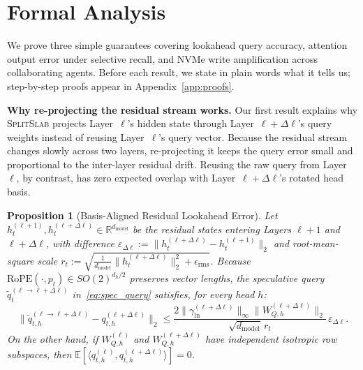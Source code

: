 \documentclass[pdflatex,sn-mathphys-num]{sn-jnl}
\theoremstyle{thmstyleone}
\newtheorem{proposition}{Proposition}
\newcommand{\SplitSlab}{\textsc{SplitSlab}}
\newcommand{\RoPE}{\mathrm{RoPE}}
\newcommand{\E}{\mathbb{E}}
\begin{document}
\section{Formal Analysis}\label{sec:theory}

We prove three simple guarantees covering lookahead query accuracy, attention output error under selective recall, and NVMe write amplification across collaborating agents. Before each result, we state in plain words what it tells us; step-by-step proofs appear in Appendix~\ref{app:proofs}.

\textbf{Why re-projecting the residual stream works.} Our first result explains why \SplitSlab{} projects Layer~$\ell$'s hidden state through Layer~$\ell+\Delta\ell$'s query weights instead of reusing Layer~$\ell$'s query vector. Because the residual stream changes slowly across two layers, re-projecting it keeps the query error small and proportional to the inter-layer residual drift. Reusing the raw query from Layer~$\ell$, by contrast, has zero expected overlap with Layer~$\ell+\Delta\ell$'s rotated head basis.

\begin{proposition}[Basis-Aligned Residual Lookahead Error]\label{prop:lookahead}
Let $h_t^{(\ell+1)}, h_t^{(\ell+\Delta\ell)} \in \mathbb{R}^{d_{\mathrm{model}}}$ be the residual states entering Layers $\ell+1$ and $\ell+\Delta\ell$, with difference $\varepsilon_{\Delta\ell} := \|h_t^{(\ell+\Delta\ell)} - h_t^{(\ell+1)}\|_2$ and root-mean-square scale $r_t := \sqrt{\frac{1}{d_{\mathrm{model}}} \|h_t^{(\ell+\Delta\ell)}\|_2^2 + \epsilon_{\mathrm{rms}}}$. Because $\RoPE(\cdot, p_t) \in SO(2)^{d_h/2}$ preserves vector lengths, the speculative query $\tilde{q}_t^{(\ell\to\ell+\Delta\ell)}$ in~\eqref{eq:spec_query} satisfies, for every head $h$:
\begin{equation}\label{eq:prop1_bound}
\Big\|\tilde{q}_{t,h}^{(\ell\to\ell+\Delta\ell)} - q_{t,h}^{(\ell+\Delta\ell)}\Big\|_2
\le
\frac{2 \|\gamma_{\mathrm{ln}}^{(\ell+\Delta\ell)}\|_\infty \|W_{Q,h}^{(\ell+\Delta\ell)}\|_2}{\sqrt{d_{\mathrm{model}}}\, r_t}\,\varepsilon_{\Delta\ell}.
\end{equation}
On the other hand, if $W_{Q,h}^{(\ell)}$ and $W_{Q,h}^{(\ell+\Delta\ell)}$ have independent isotropic row subspaces, then $\E[\langle q_{t,h}^{(\ell)}, q_{t,h}^{(\ell+\Delta\ell)} \rangle] = 0$.
\end{proposition}
\end{document}
